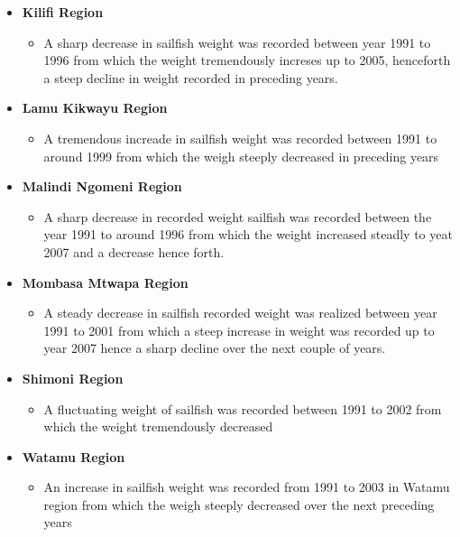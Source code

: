 \documentclass[
]{article}
\providecommand{\tightlist}{%
  \setlength{\itemsep}{0pt}\setlength{\parskip}{0pt}}
\begin{document}
\begin{itemize}
\tightlist
\item
  \textbf{Kilifi Region}

  \begin{itemize}
  \tightlist
  \item
    A sharp decrease in sailfish weight was recorded between year 1991
    to 1996 from which the weight tremendously increses up to 2005,
    henceforth a steep decline in weight recorded in preceding years.
  \end{itemize}
\item
  \textbf{Lamu Kikwayu Region}

  \begin{itemize}
  \tightlist
  \item
    A tremendous increade in sailfish weight was recorded between 1991
    to around 1999 from which the weigh steeply decreased in preceding
    years
  \end{itemize}
\item
  \textbf{Malindi Ngomeni Region}

  \begin{itemize}
  \tightlist
  \item
    A sharp decrease in recorded weight sailfish was recorded between
    the year 1991 to around 1996 from which the weight increased steadly
    to yeat 2007 and a decrease hence forth.
  \end{itemize}
\item
  \textbf{Mombasa Mtwapa Region}

  \begin{itemize}
  \tightlist
  \item
    A steady decrease in sailfish recorded weight was realized between
    year 1991 to 2001 from which a steep increase in weight was recorded
    up to year 2007 hence a sharp decline over the next couple of years.
  \end{itemize}
\end{itemize}

\newpage

\begin{itemize}
\tightlist
\item
  \textbf{Shimoni Region}

  \begin{itemize}
  \tightlist
  \item
    A fluctuating weight of sailfish was recorded between 1991 to 2002
    from which the weight tremendously decreased
  \end{itemize}
\item
  \textbf{Watamu Region}

  \begin{itemize}
  \tightlist
  \item
    An increase in sailfish weight was recorded from 1991 to 2003 in
    Watamu region from which the weigh steeply decreased over the next
    preceding years
  \end{itemize}
\end{itemize}
\end{document}
